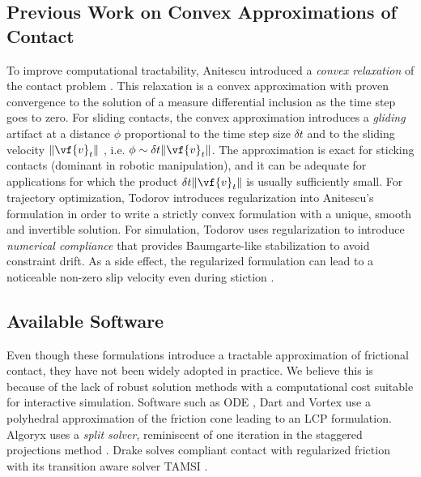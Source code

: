 \subsection{Previous Work on Convex Approximations of Contact}
To improve computational tractability, Anitescu introduced a \textit{convex
relaxation} of the contact problem \cite{bib:anitescu2006}. This relaxation is a
convex approximation with proven convergence to the solution of a measure
differential inclusion as the time step goes to zero. For sliding contacts, the
convex approximation introduces a \emph{gliding} artifact at a distance $\phi$
proportional to the time step size $\delta t$ and to the sliding velocity
$\Vert\vf{v}_t\Vert$ \cite{bib:mazhar2014}, i.e. $\phi\sim \delta
t\Vert\vf{v}_t\Vert$. The approximation is exact for sticking contacts (dominant
in robotic manipulation), and it can be adequate for applications for which the
product $\delta t\Vert\vf{v}_t\Vert$ is usually sufficiently small. For
trajectory optimization, Todorov \cite{bib:todorov2011} introduces
regularization into Anitescu's formulation in order to write a strictly convex
formulation with a unique, smooth and invertible solution. For simulation,
Todorov \cite{bib:todorov2014} uses regularization to introduce \emph{numerical
compliance} that provides Baumgarte-like stabilization to avoid constraint
drift. As a side effect, the regularized formulation can lead to a noticeable
non-zero slip velocity even during stiction \cite{bib:simbenchmark}.

\subsection{Available Software}
Even though these formulations introduce a tractable approximation of frictional
contact, they have not been widely adopted in practice. We believe this is
because of the lack of robust solution methods with a computational cost
suitable for interactive simulation. Software such as ODE \cite{bib:ode}, Dart
\cite{bib:dart} and Vortex \cite{bib:vortex} use a polyhedral approximation of
the friction cone leading to an LCP formulation. Algoryx \cite{bib:algoryx} uses
a \emph{split solver}, reminiscent of one iteration in the staggered projections
method \cite{bib:Kaufman2008}. Drake \cite{bib:drake} solves compliant contact
with regularized friction with its transition aware solver TAMSI
\cite{bib:castro2020}. 

